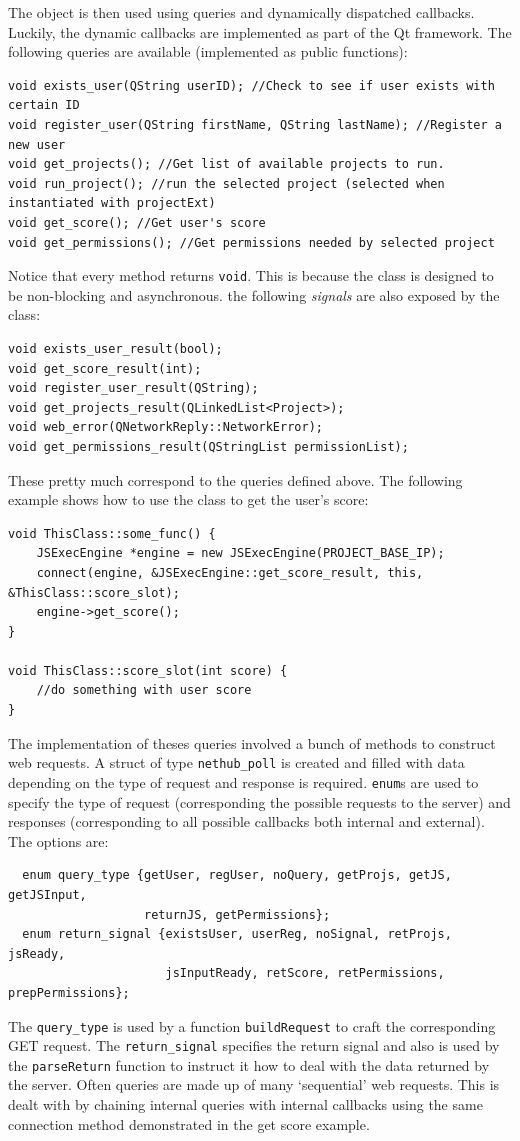 \documentclass{article}
\begin{document}
The object is then used using queries and dynamically dispatched callbacks. Luckily, the dynamic callbacks are implemented as part
of the Qt framework. The following queries are available (implemented as public functions):
\begin{verbatim}
void exists_user(QString userID); //Check to see if user exists with certain ID
void register_user(QString firstName, QString lastName); //Register a new user
void get_projects(); //Get list of available projects to run.
void run_project(); //run the selected project (selected when instantiated with projectExt)
void get_score(); //Get user's score
void get_permissions(); //Get permissions needed by selected project
\end{verbatim}
Notice that every method returns \texttt{void}. This is because the class is designed to be non-blocking and asynchronous.
the following \textit{signals} are also exposed by the class:
\begin{verbatim}
void exists_user_result(bool);
void get_score_result(int);
void register_user_result(QString);
void get_projects_result(QLinkedList<Project>);
void web_error(QNetworkReply::NetworkError);
void get_permissions_result(QStringList permissionList);
\end{verbatim}
These pretty much correspond to the queries defined above. The following example shows how to use the class to get the user's score:
\begin{verbatim}
void ThisClass::some_func() {
    JSExecEngine *engine = new JSExecEngine(PROJECT_BASE_IP);
    connect(engine, &JSExecEngine::get_score_result, this, &ThisClass::score_slot);
    engine->get_score();
}

void ThisClass::score_slot(int score) {
    //do something with user score
}
\end{verbatim}

The implementation of theses queries involved a bunch of methods to construct web requests. A struct of type \texttt{nethub\_poll}
is created and filled with data depending on the type of request and response is required. \texttt{enum}s are used to specify
the type of request (corresponding the possible requests to the server) and responses (corresponding to all possible callbacks
both internal and external). The options are:
\begin{verbatim}
  enum query_type {getUser, regUser, noQuery, getProjs, getJS, getJSInput, 
                   returnJS, getPermissions};
  enum return_signal {existsUser, userReg, noSignal, retProjs, jsReady,
                      jsInputReady, retScore, retPermissions, prepPermissions};
\end{verbatim}
The \texttt{query\_type} is used by a function \texttt{buildRequest} to craft the corresponding GET request. The
\texttt{return\_signal} specifies the return signal and also is used by the \texttt{parseReturn} function to instruct it
how to deal with the data returned by the server. Often queries are made up of many `sequential' web requests. This is dealt with
by chaining internal queries with internal callbacks using the same connection method demonstrated in the get score example.
\end{document}
